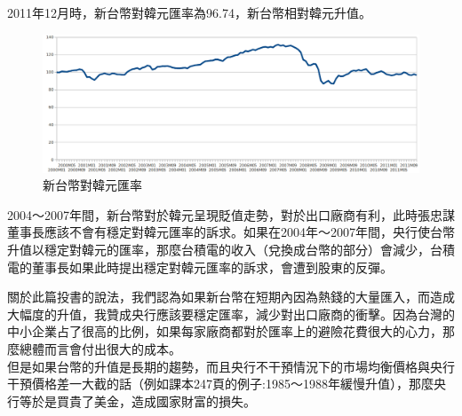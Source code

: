 \documentclass[12pt]{article}
\begin{document}
\begin{CJK}{UTF8}{cwmb}
\begin{num}
\begin{num}
\begin{figure}[htp]
			\label{}
		\end{figure}
		\item 2011年12月時，新台幣對韓元匯率為96.74，新台幣相對韓元升值。
		\begin{figure}[htp]
			\centering
			\includegraphics[scale=0.4]{ntdk.png}
			\caption{新台幣對韓元匯率}
			\label{}
		\end{figure}
		\item 2004～2007年間，新台幣對於韓元呈現貶值走勢，對於出口廠商有利，此時張忠謀董事長應該不會有穩定對韓元匯率的訴求。如果在2004年～2007年間，央行使台幣升值以穩定對韓元的匯率，那麼台積電的收入（兌換成台幣的部分）會減少，台積電的董事長如果此時提出穩定對韓元匯率的訴求，會遭到股東的反彈。
		\item 關於此篇投書的說法，我們認為如果新台幣在短期內因為熱錢的大量匯入，而造成大幅度的升值，我贊成央行應該要穩定匯率，減少對出口廠商的衝擊。因為台灣的中小企業占了很高的比例，如果每家廠商都對於匯率上的避險花費很大的心力，那麼總體而言會付出很大的成本。
		\\但是如果台幣的升值是長期的趨勢，而且央行不干預情況下的市場均衡價格與央行干預價格差一大截的話（例如課本247頁的例子:1985～1988年緩慢升值），那麼央行等於是買貴了美金，造成國家財富的損失。
	\end{num}
\end{num}
\end{CJK}
\end{document}

